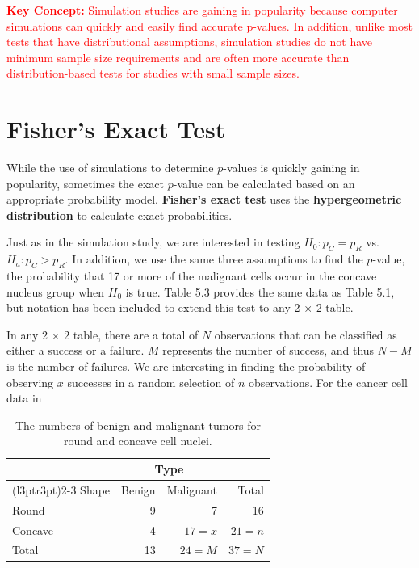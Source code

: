 \documentclass[
]{report}
\begin{document}
\textbf{\textcolor{red}{Key Concept:}}
\textcolor{red}{Simulation studies are gaining in popularity because computer simulations can quickly and easily find
accurate p-values. In addition, unlike most tests that have distributional assumptions, simulation studies
do not have minimum sample size requirements and are often more accurate than distribution-based
tests for studies with small sample sizes.}
\normalsize

\hypertarget{fishers-exact-test}{%
\section{\texorpdfstring{\textbf{Fisher's Exact Test}}{Fisher's Exact Test}}\label{fishers-exact-test}}

While the use of simulations to determine \(p\)-values is quickly gaining in popularity, sometimes the exact \(p\)-value can be calculated based on an appropriate probability model. \textbf{Fisher's exact test} uses the \textbf{hypergeometric distribution} to calculate exact probabilities.

Just as in the simulation study, we are interested in testing \(H_0: p_C = p_R\) vs.~\(H_a: p_C > p_R\). In addition, we use the same three assumptions to find the \(p\)-value, the probability that 17 or more of the malignant cells occur in the concave nucleus group when \(H_0\) is true. Table 5.3 provides the same data as Table 5.1, but notation has been included to extend this test to any 2 × 2 table.

In any 2 × 2 table, there are a total of \(N\) observations that can be classified as either a success or a failure. \(M\) represents the number of success, and thus \(N - M\) is the number of failures. We are interesting in finding the probability of observing \(x\) successes in a random selection of \(n\) observations. For the cancer cell data in

\begin{table}[H]
\centering
\caption{\label{tab:tab3}The numbers of benign and malignant tumors for round and concave cell nuclei.}
\centering
\begin{tabular}[t]{lrrr}
\toprule
\multicolumn{1}{c}{ } & \multicolumn{2}{c}{Type} & \multicolumn{1}{c}{ } \\
\cmidrule(l{3pt}r{3pt}){2-3}
Shape & Benign & Malignant & Total\\
\midrule
Round & 9 & 7 & 16\\
Concave & 4 & $17 = x$ & $21 = n$\\
Total & 13 & $24 = M$ & $37 = N$\\
\bottomrule
\end{tabular}
\end{table}
\end{document}
